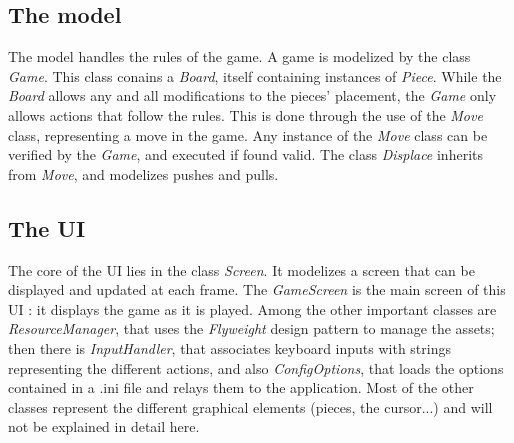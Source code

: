 \subsection{The model}

The model handles the rules of the game.
A game is modelized by the class \emph{Game}.
This class conains a \emph{Board}, itself containing instances of \emph{Piece}.
While the \emph{Board} allows any and all modifications to the pieces' placement, the \emph{Game} only allows actions that follow the rules.
This is done through the use of the \emph{Move} class, representing a move in the game.
Any instance of the \emph{Move} class can be verified by the \emph{Game}, and executed if found valid.
The class \emph{Displace} inherits from \emph{Move}, and modelizes pushes and pulls.

\subsection{The UI}

The core of the UI lies in the class \emph{Screen}.
It modelizes a screen that can be displayed and updated at each frame.
The \emph{GameScreen} is the main screen of this UI : it displays the game as it is played.
Among the other important classes are \emph{ResourceManager}, that uses the \emph{Flyweight} design pattern to manage the assets;
then there is \emph{InputHandler}, that associates keyboard inputs with strings representing the different actions,
and also \emph{ConfigOptions}, that loads the options contained in a .ini file and relays them to the application.
Most of the other classes represent the different graphical elements (pieces, the cursor...) and will not be explained in detail here.